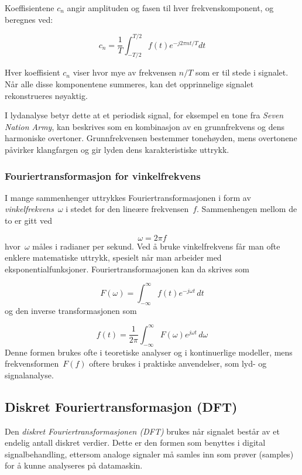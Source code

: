 Koeffisientene $c_n$ angir amplituden og fasen til hver frekvenskomponent, og beregnes ved:

\begin{equation*}
    c_n = \frac{1}{T} \int_{-T/2}^{T/2} f(t)e^{-j2\pi n t/T} dt
\end{equation*}

Hver koeffisient $c_n$ viser hvor mye av frekvensen $n/T$ som er til stede i signalet. 
Når alle disse komponentene summeres, kan det opprinnelige signalet rekonstrueres nøyaktig.  

I lydanalyse betyr dette at et periodisk signal, for eksempel en tone fra \textit{Seven Nation Army}, 
kan beskrives som en kombinasjon av en grunnfrekvens og dens harmoniske overtoner. Grunnfrekvensen bestemmer tonehøyden, 
mens overtonene påvirker klangfargen og gir lyden dens karakteristiske uttrykk.

\subsubsection{Fouriertransformasjon for vinkel­frekvens}
I mange sammenhenger uttrykkes Fouriertransformasjonen i form av \emph{vinkelfrekvens}~$\omega$ i stedet for den lineære frekvensen~$f$. Sammenhengen mellom de to er gitt ved

\begin{equation}
    \omega = 2\pi f
\end{equation}
hvor~$\omega$ måles i radianer per sekund. Ved å bruke vinkelfrekvens får man ofte enklere matematiske uttrykk, spesielt når man arbeider med eksponentialfunksjoner. Fouriertransformasjonen kan da skrives som

\begin{equation}
    F(\omega) = \int_{-\infty}^{\infty} f(t)e^{-j\omega t}\,dt
\end{equation}
og den inverse transformasjonen som

\begin{equation}
    f(t) = \frac{1}{2\pi}\int_{-\infty}^{\infty} F(\omega)e^{j\omega t}\,d\omega
\end{equation}
Denne formen brukes ofte i teoretiske analyser og i kontinuerlige modeller, mens frekvensformen~$F(f)$ oftere brukes i praktiske anvendelser, som lyd- og signalanalyse.


\subsection{Diskret Fouriertransformasjon (DFT)}
Den \emph{diskret Fouriertransformasjonen (DFT)} brukes når signalet består av et endelig antall diskret verdier. Dette er den formen som benyttes i digital signalbehandling, ettersom analoge signaler må samles inn som prøver (samples) for å kunne analyseres på datamaskin.

